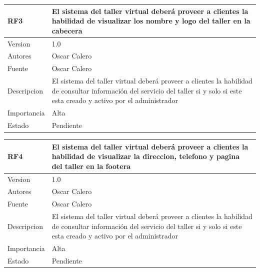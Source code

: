 \documentclass[10pt,a4paper,openany]{book}
\begin{document}
\begin{longtable}{|p{3cm}|p{3cm}|p{3cm}|p{3cm}|p{3cm}|} \hline	

RF3 & \multicolumn{4}{p{12cm}|}{El sistema del taller virtual deberá proveer a clientes la habilidad de visualizar los nombre y logo del taller en la cabecera} \\ \hline	
Version     & \multicolumn{4}{p{12cm}|}{1.0} \\ \hline	
Autores & \multicolumn{4}{p{12cm}|}{Oscar Calero} \\ \hline	
Fuente                & \multicolumn{4}{p{12cm}|}{Oscar Calero} \\ \hline	
Descripcion         & \multicolumn{4}{p{12cm}|}{El sistema del taller virtual deberá proveer a clientes la habilidad de consultar información del servicio del taller si y solo si este esta creado y activo por el administrador} \\ \hline	
Importancia                 & \multicolumn{4}{p{12cm}|}{Alta} \\ \hline	
Estado        & \multicolumn{4}{p{12cm}|}{Pendiente} \\ \hline	
\end{longtable}	


\begin{longtable}{|p{3cm}|p{3cm}|p{3cm}|p{3cm}|p{3cm}|} \hline	

RF4 & \multicolumn{4}{p{12cm}|}{El sistema del taller virtual deberá proveer a clientes la habilidad de visualizar la direccion, telefono  y pagina del taller en la footera} \\ \hline	
Version     & \multicolumn{4}{p{12cm}|}{1.0} \\ \hline	
Autores & \multicolumn{4}{p{12cm}|}{Oscar Calero} \\ \hline	
Fuente                & \multicolumn{4}{p{12cm}|}{Oscar Calero} \\ \hline	
Descripcion         & \multicolumn{4}{p{12cm}|}{El sistema del taller virtual deberá proveer a clientes la habilidad de consultar información del servicio del taller si y solo si este esta creado y activo por el administrador} \\ \hline	
Importancia                 & \multicolumn{4}{p{12cm}|}{Alta} \\ \hline	
Estado        & \multicolumn{4}{p{12cm}|}{Pendiente} \\ \hline	
\end{longtable}	
\end{document}
